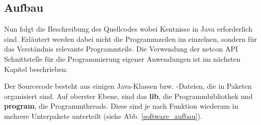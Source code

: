 \documentclass[a4paper,14pt,headsepline]{scrartcl}
\begin{document}
\begin{figure}[h]
\begin{center}
\end{center}
\end{figure}

\newpage

\subsection{Aufbau}

Nun folgt die Beschreibung des Quellcodes wobei Kentnisse in Java erforderlich sind. Erläutert werden dabei nicht die Programmzeilen im einzelnen, sondern für das Verständnis relevante Programmteile. Die Verwendung der netcon API Schnittstelle für die Programmierung eigener Anwendungen ist im nächsten Kapitel beschrieben: 

Der Sourcecode besteht aus einigen Java-Klassen bzw. -Dateien, die in Paketen organisiert sind. Auf oberster Ebene, sind das \textbf{lib}, die Programmbibliothek und \textbf{program}, die Programmthreads. Diese sind je nach Funktion wiederum in mehrere Unterpakete unterteilt (siehe Abb. \ref{software_aufbau}).
\end{document}
